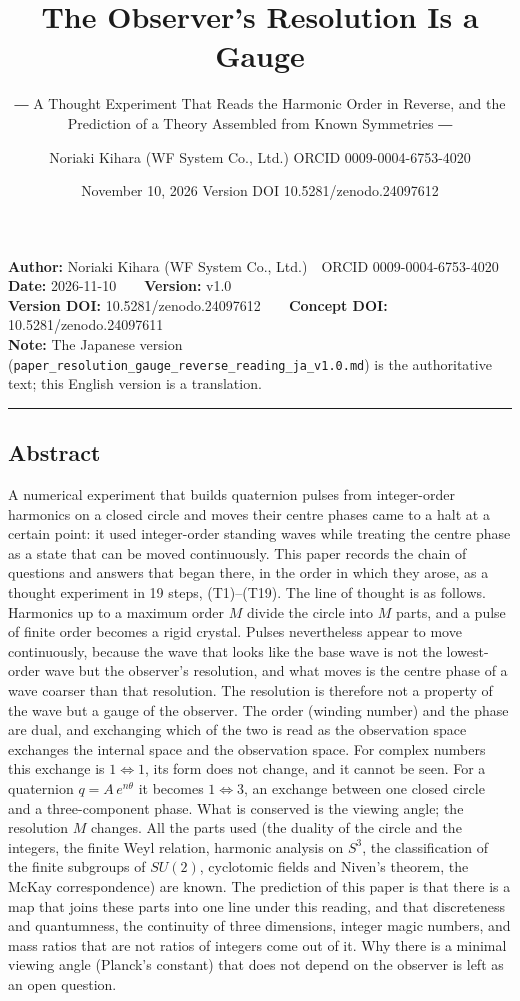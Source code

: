 \documentclass[
  a4paper,
]{article}
\title{The Observer's Resolution Is a Gauge}
\subtitle{― A Thought Experiment That Reads the Harmonic Order in
Reverse, and the Prediction of a Theory Assembled from Known Symmetries
―}
\author{Noriaki Kihara (WF System Co., Ltd.) ORCID 0009-0004-6753-4020}
\date{November 10, 2026 Version DOI 10.5281/zenodo.24097612}
\begin{document}
\maketitle

\textbf{Author:} Noriaki Kihara (WF System Co., Ltd.)　ORCID
0009-0004-6753-4020\\
\textbf{Date:} 2026-11-10　　\textbf{Version:} v1.0\\
\textbf{Version DOI:} 10.5281/zenodo.24097612　　\textbf{Concept DOI:}
10.5281/zenodo.24097611\\
\textbf{Note:} The Japanese version
(\texttt{paper\_\allowbreak{}resolution\_\allowbreak{}gauge\_\allowbreak{}reverse\_\allowbreak{}reading\_\allowbreak{}ja\_\allowbreak{}v1.0.md}) is
the authoritative text; this English version is a translation.

\begin{center}\rule{0.5\linewidth}{0.5pt}\end{center}

\subsection{Abstract}\label{abstract}

A numerical experiment that builds quaternion pulses from integer-order
harmonics on a closed circle and moves their centre phases came to a
halt at a certain point: it used integer-order standing waves while
treating the centre phase as a state that can be moved continuously.
This paper records the chain of questions and answers that began there,
in the order in which they arose, as a thought experiment in 19 steps,
(T1)--(T19). The line of thought is as follows. Harmonics up to a
maximum order \(M\) divide the circle into \(M\) parts, and a pulse of
finite order becomes a rigid crystal. Pulses nevertheless appear to move
continuously, because the wave that looks like the base wave is not the
lowest-order wave but the observer's resolution, and what moves is the
centre phase of a wave coarser than that resolution. The resolution is
therefore not a property of the wave but a gauge of the observer. The
order (winding number) and the phase are dual, and exchanging which of
the two is read as the observation space exchanges the internal space
and the observation space. For complex numbers this exchange is
\(1\Leftrightarrow1\), its form does not change, and it cannot be seen.
For a quaternion \(q=A\,e^{n\theta}\) it becomes \(1\Leftrightarrow3\),
an exchange between one closed circle and a three-component phase. What
is conserved is the viewing angle; the resolution \(M\) changes. All the
parts used (the duality of the circle and the integers, the finite Weyl
relation, harmonic analysis on \(S^3\), the classification of the finite
subgroups of \(SU(2)\), cyclotomic fields and Niven's theorem, the McKay
correspondence) are known. The prediction of this paper is that there is
a map that joins these parts into one line under this reading, and that
discreteness and quantumness, the continuity of three dimensions,
integer magic numbers, and mass ratios that are not ratios of integers
come out of it. Why there is a minimal viewing angle (Planck's constant)
that does not depend on the observer is left as an open question.
\end{document}
